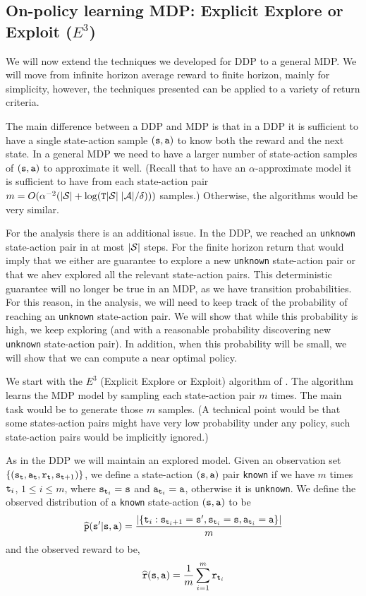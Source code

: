 \subsection{On-policy learning MDP: Explicit Explore or Exploit ($E^3$)}

We will now extend the techniques we developed for DDP to a general
MDP. We will move from infinite horizon average reward to finite
horizon, mainly for simplicity, however, the techniques presented
can be applied to a variety of return criteria.

The main difference between a DDP and MDP is that in a DDP it is sufficient to have a single state-action sample $({\tt s},{\tt a})$ to know both the reward and the next state. In a general MDP we need to have a larger number of state-action samples of $({\tt s},{\tt a})$ to approximate it well. (Recall that to have an $\alpha$-approximate model it is sufficient to have from each state-action pair $m=O(\alpha^{-2}(|\mathcal{S}|+\log({\tt T} |\mathcal{S}|\;|\mathcal{A}|/\delta)))$ samples.)
Otherwise, the algorithms would be very similar.

For the analysis there is an additional issue. In the DDP, we reached an \texttt{unknown} state-action pair in at most $|\mathcal{S}|$ steps. For the finite horizon return that would imply that we either are guarantee to explore a new \texttt{unknown} state-action pair  or that we ahev explored all the relevant state-action pairs. This deterministic guarantee will no longer be true in an MDP, as we have transition probabilities. For this reason, in the analysis, we will need to keep track of the probability of reaching an \texttt{unknown} state-action pair. We will show that while this probability is high, we keep exploring (and with a reasonable probability discovering new \texttt{unknown} state-action pair). In addition, when this probability will be small, we will show that we can compute a near optimal policy.

We start with the $E^3$ (Explicit Explore or Exploit) algorithm of
\cite{KearnsS02}. The algorithm learns the MDP model by sampling
each state-action pair $m$ times. The main task would be to generate
those $m$ samples. (A technical point would be that some
states-action pairs might have very low probability under any
policy, such state-action pairs would be implicitly ignored.)

As in the DDP we will maintain an explored model. Given an
observation set $\{({\tt s}_{\tt t},{\tt a}_{\tt t} ,{\tt r}_{\tt t},
{\tt s}_{{\tt t}+1})\}$, we define a state-action $({\tt s},{\tt a})$
pair \texttt{known} if we have $m$ times ${\tt t}_i$, $1\leq i \leq m$,
where ${\tt s}_{{\tt t}_i}={\tt s}$ and ${\tt a}_{{\tt t}_i}={\tt a}$,
otherwise it is \texttt{unknown}. We define the observed distribution
of a \texttt{known} state-action $({\tt s},{\tt a})$ to be
\[
\widehat{{\tt p}}({\tt s}'|{\tt s},{\tt a})= \frac{|\{{\tt t}_i
:{\tt s}_{{\tt t}_i+1}={\tt s}',{\tt s}_{{\tt t}_i}={\tt s},{\tt a}_{{\tt t}_i}={\tt a}\}|}{m}
\]
and the observed reward to be,
\[
\widehat{{\tt r}}({\tt s},{\tt a})=\frac{1}{m}\sum_{i=1}^m
{\tt r}_{{\tt t}_i}
\]


